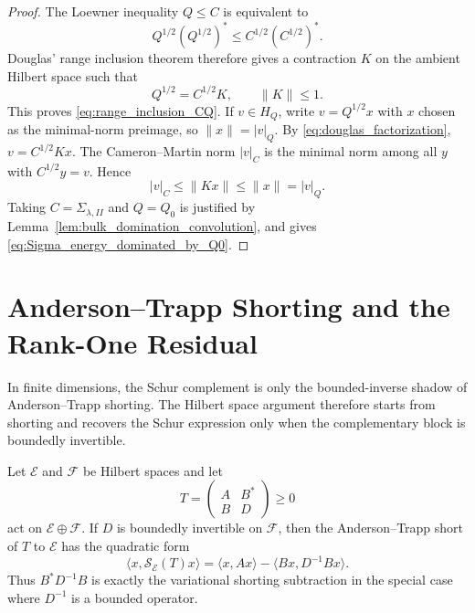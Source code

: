 \begin{proof}
The Loewner inequality $Q\le C$ is equivalent to
\[
  Q^{1/2}(Q^{1/2})^*\le C^{1/2}(C^{1/2})^* .
\]
Douglas' range inclusion theorem therefore gives a contraction $K$ on the
ambient Hilbert space such that
\begin{equation}
  Q^{1/2}=C^{1/2}K,
  \qquad \|K\|\le1.
  \label{eq:douglas_factorization}
\end{equation}
This proves \eqref{eq:range_inclusion_CQ}.  If $v\in H_Q$, write
$v=Q^{1/2}x$ with $x$ chosen as the minimal-norm preimage, so
$\|x\|=|v|_Q$.  By \eqref{eq:douglas_factorization},
$v=C^{1/2}Kx$.  The Cameron--Martin norm $|v|_C$ is the minimal norm among all
$y$ with $C^{1/2}y=v$.  Hence
\[
  |v|_C\le \|Kx\|\le\|x\|=|v|_Q.
\]
Taking $C=\Sigma_{\lambda,II}$ and $Q=Q_0$ is justified by
Lemma~\ref{lem:bulk_domination_convolution}, and gives
\eqref{eq:Sigma_energy_dominated_by_Q0}.
\end{proof}

\section{Anderson--Trapp Shorting and the Rank-One Residual}
\label{app:shorting_residual}

In finite dimensions, the Schur complement is only the bounded-inverse
shadow of Anderson--Trapp shorting.  The Hilbert space argument therefore
starts from shorting and recovers the Schur expression only when the
complementary block is boundedly invertible.

\begin{lemma}
\label{lem:schur_shadow_shorting}
Let $\mathcal{E}$ and $\mathcal{F}$ be Hilbert spaces and let
\[
  T=\begin{pmatrix}A&B^*\\B&D\end{pmatrix}\ge0
\]
act on $\mathcal{E}\oplus\mathcal{F}$.  If $D$ is boundedly invertible on
$\mathcal{F}$, then the Anderson--Trapp short of $T$ to $\mathcal{E}$ has the
quadratic form
\begin{equation}
  \langle x,\mathcal{S}_{\mathcal{E}}(T)x\rangle
  =
  \langle x,Ax\rangle-\langle Bx,D^{-1}Bx\rangle.
  \label{eq:short_shadow}
\end{equation}
Thus $B^*D^{-1}B$ is exactly the variational shorting subtraction in the special
case where $D^{-1}$ is a bounded operator.
\end{lemma}

